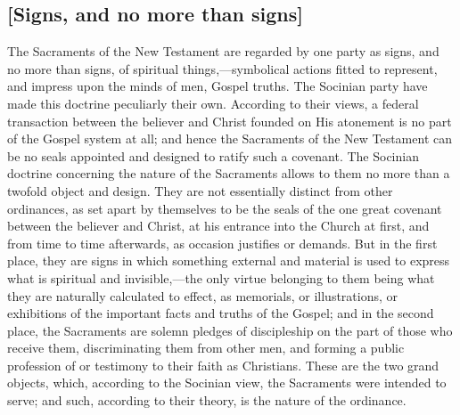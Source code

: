 \documentclass[
  english,
]{book}
\begin{document}
\hypertarget{signs-and-no-more-than-signs}{%
\subsection{{[}Signs, and no more than signs{]}}\label{signs-and-no-more-than-signs}}

The Sacraments of the New Testament are regarded by one party as signs, and no more than signs, of spiritual things,---symbolical actions fitted to represent, and impress upon the minds of men, Gospel truths. The Socinian party have made this doctrine peculiarly their own. According to their views, a federal transaction between the believer and Christ founded on His atonement is no part of the Gospel system at all; and hence the Sacraments of the New Testament can be no seals appointed and designed to ratify such a covenant. The Socinian doctrine concerning the nature of the Sacraments allows to them no more than a twofold object and design. They are not essentially distinct from other ordinances, as set apart by themselves to be the seals of the one great covenant between the believer and Christ, at his entrance into the Church at first, and from time to time afterwards, as occasion justifies or demands. But in the first place, they are signs in which something external and material is used to express what is spiritual and invisible,---the only virtue belonging to them being what they are naturally calculated to effect, as memorials, or illustrations, or exhibitions of the important facts and truths of the Gospel; and in the second place, the Sacraments are solemn pledges of discipleship on the part of those who receive them, discriminating them from other men, and forming a public profession of or testimony to their faith as Christians. These are the two grand objects, which, according to the Socinian view, the Sacraments were intended to serve; and such, according to their theory, is the nature of the ordinance.
\end{document}
